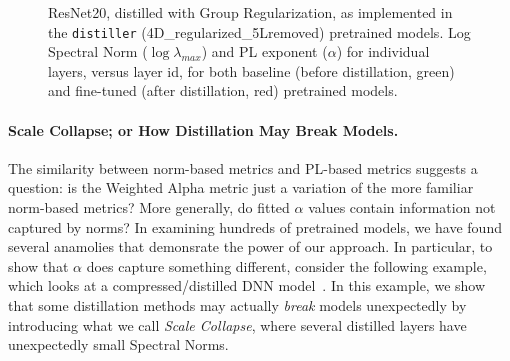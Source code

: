\begin{figure}[t]
   \centering
   \qquad
   \caption{%
            ResNet20, distilled with Group Regularization, as implemented in the \texttt{distiller} (4D\_regularized\_5Lremoved) pretrained models.  
            Log Spectral Norm ($\log\lambda_{max}$) and PL exponent ($\alpha$) for individual layers, versus layer id, for both baseline (before distillation, green) and fine-tuned (after distillation, red) pretrained models. 
           }
   \label{fig:resnet204D5L}
\end{figure}


\paragraph{Scale Collapse; or How Distillation May Break Models.}

The similarity between norm-based metrics and PL-based metrics suggests a question: is the Weighted Alpha metric just a variation of the more familiar norm-based metrics?  %
More generally, do fitted $\alpha$ values contain information not captured by norms? 
In examining hundreds of pretrained models, we have found several anamolies that demonsrate the power of our approach.
In particular, to show that $\alpha$ does capture something different, consider the following example, which looks at a compressed/distilled DNN model~\cite{CWZZ17_TR}.
In this example, we show that some distillation methods may actually \emph{break} models unexpectedly by introducing what we call \emph{Scale Collapse}, where several distilled layers have unexpectedly small Spectral Norms.

